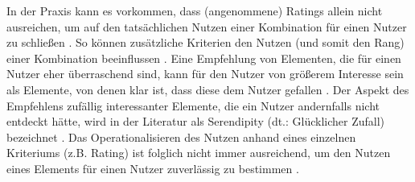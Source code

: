 

In der Praxis kann es vorkommen, dass (angenommene) Ratings allein nicht ausreichen, um auf den tatsächlichen Nutzen einer Kombination für einen Nutzer zu schließen \cite[S. 896ff.]{adomavicius:article}.
So können zusätzliche Kriterien den Nutzen (und somit den Rang) einer Kombination beeinflussen \cite[S. 405f.]{unternährer:article}.
Eine Empfehlung von Elementen, die für einen Nutzer eher überraschend sind, kann für den Nutzer von größerem Interesse sein als Elemente, von denen klar ist, dass diese dem Nutzer gefallen \cite[S. 43]{herlocker:article}.
Der Aspekt des Empfehlens zufällig interessanter Elemente, die ein Nutzer andernfalls nicht entdeckt hätte, wird in der Literatur als Serendipity (dt.: Glücklicher Zufall) bezeichnet \cite[S. 43]{herlocker:article}\cite[S. 3]{recommenderSystems:2016}\cite[S. 1099]{mcnee:inproceedings}.
Das Operationalisieren des Nutzen anhand eines einzelnen Kriteriums (z.B. Rating) ist folglich nicht immer ausreichend, um den Nutzen eines Elements für einen Nutzer zuverlässig zu bestimmen \cite[S. 847]{adomavicius:4:inbook}.

